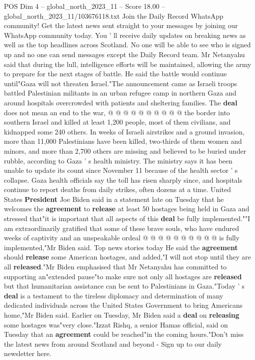 \begin{textsample}{POS Dim 4 – global\_north\_2023\_11 – Score 18.00 – global\_north\_2023\_11/103676118.txt}
Join the Daily Record WhatsApp community!
Get the latest news sent straight to your messages by joining our WhatsApp community today.
You ' ll receive daily updates on breaking news as well as the top headlines across Scotland.
No one will be able to see who is signed up and no one can send messages except the Daily Record team.
Mr Netanyahu said that during the lull, intelligence efforts will be maintained, allowing the army to prepare for the next stages of battle.
He said the battle would continue until"Gaza will not threaten Israel."The announcement came as Israeli troops battled Palestinian militants in an urban refugee camp in northern Gaza and around hospitals overcrowded with patients and sheltering families.
The \textbf{deal} does not mean an end to the war, @ @ @ @ @ @ @ @ @ @ the border into southern Israel and killed at least 1,200 people, most of them civilians, and kidnapped some 240 others.
In weeks of Israeli airstrikes and a ground invasion, more than 11,000 Palestinians have been killed, two-thirds of them women and minors, and more than 2,700 others are missing and believed to be buried under rubble, according to Gaza ' s health ministry.
The ministry says it has been unable to update its count since November 11 because of the health sector ' s collapse.
Gaza health officials say the toll has risen sharply since, and hospitals continue to report deaths from daily strikes, often dozens at a time.
United States \textbf{President} Joe Biden said in a statement late on Tuesday that he welcomes the \textbf{agreement} to \textbf{release} at least 50 hostages being held in Gaza and stressed that"it is important that all aspects of this \textbf{deal} be fully implemented.""I am extraordinarily gratified that some of these brave souls, who have endured weeks of captivity and an unspeakable ordeal @ @ @ @ @ @ @ @ @ @ is fully implemented,"Mr Biden said.
Top news stories today He said the \textbf{agreement} should \textbf{release} some American hostages, and added,"I will not stop until they are all \textbf{released}."Mr Biden emphasised that Mr Netanyahu has committed to supporting an"extended pause"to make sure not only all hostages are \textbf{released} but that humanitarian assistance can be sent to Palestinians in Gaza."Today ' s \textbf{deal} is a testament to the tireless diplomacy and determination of many dedicated individuals across the United States Government to bring Americans home,"Mr Biden said.
Earlier on Tuesday, Mr Biden said a \textbf{deal} on \textbf{releasing} some hostages was"very close."Izzat Rishq, a senior Hamas official, said on Tuesday that an \textbf{agreement} could be reached"in the coming hours."Don't miss the latest news from around Scotland and beyond - Sign up to our daily newsletter here.

\end{textsample}
